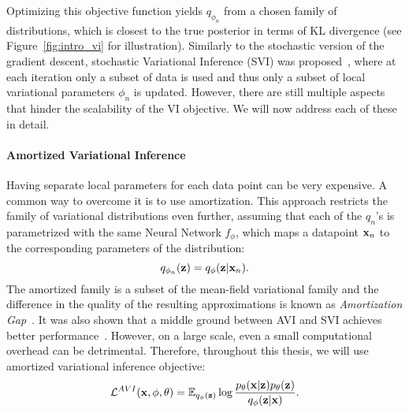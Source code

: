 Optimizing this objective function yields $q_{\phi_n}$ from a chosen family of distributions, which is closest to the true posterior in terms of KL divergence (see Figure~\ref{fig:intro_vi} for illustration). Similarly to the stochastic version of the gradient descent, stochastic Variational Inference (SVI) was proposed~\citep{hoffman2013stochastic}, where at each iteration only a subset of data is used and thus only a subset of local variational parameters $\phi_n$ is updated. 
However, there are still multiple aspects that hinder the scalability of the VI objective. We will now address each of these in detail. 


\paragraph{Amortized Variational Inference}
Having separate local parameters for each data point can be very expensive. 
A common way to overcome it is to use amortization. This approach restricts the family of variational distributions even further, assuming that each of the $q_n$'s is parametrized with the same Neural Network $f_{\phi}$, which maps a datapoint ${\mathbf{x}}_n$ to the corresponding parameters of the distribution: 
\begin{equation}
    q_{\phi_n}({\mathbf{z}}) = q_{\phi}({\mathbf{z}} |{\mathbf{x}}_n).
\end{equation}
The amortized family is a subset of the mean-field variational family and the difference in the quality of the resulting approximations is known as \textit{Amortization Gap}~\citep{cremer2018inference}. It was also shown that a middle ground between AVI and SVI achieves better performance~\citep{kim2018semi}. However, on a large scale, even a small computational overhead can be detrimental. Therefore, throughout this thesis, we will use amortized variational inference objective:
\begin{equation}\label{eq:intro_avi}
     \mathcal{L}^{AVI}(\rvx, \phi, \theta) =  \E_{q_{\phi}(\rvz)}\log  \frac{p_{\theta}(\rvx|\rvz)p_{\theta}(\rvz)}{q_{\phi}(\rvz|\rvx)}.
\end{equation}

